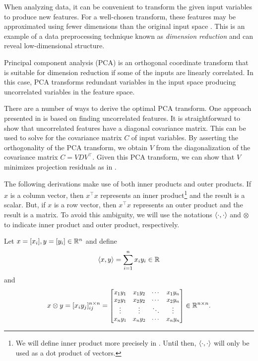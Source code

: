When analyzing data, it can be convenient to transform the given input variables to produce new features.
For a well-chosen transform, these features may be approximated using fewer dimensions than the original input space \cite{koutroumbas2008pattern}.
This is an example of a data preprocessing technique known as \textit{dimension reduction} and can reveal low-dimensional structure.

Principal component analysis (PCA) is an orthogonal coordinate transform that is suitable for dimension reduction if some of the inputs are linearly correlated.
In this case, PCA transforms redundant variables in the input space producing uncorrelated variables in the feature space.

There are a number of ways to derive the optimal PCA transform.
One approach presented in \cite{koutroumbas2008pattern} is based on finding uncorrelated features.
It is straightforward to show that uncorrelated features have a diagonal covariance matrix.
This can be used to solve for the covariance matrix \(C\) of input variables.
By asserting the orthogonality of the PCA transform, we obtain \(V\) from the diagonalization of the covariance matrix \(C = VDV^\top\).
Given this PCA transform, we can show that \(V\) minimizes projection residuals as in \cite{shalizi2021advanced}.

\begin{remark}
    \label{rmk:inner-outer-product-notation}
    The following derivations make use of both inner products and outer products.
    If \(x\) is a column vector, then \(x^\top x\) represents an inner product\footnote{
        We will define inner product more precisely in .
        Until then, \(\left\langle \cdot, \cdot \right\rangle\) will only be used as a dot product of vectors.
    } and the result is a scalar.
    But, if \(x\) is a row vector, then \(x^\top x\) represents an outer product and the result is a matrix.
    To avoid this ambiguity, we will use the notations \(\left\langle \cdot, \cdot \right\rangle\) and \(\otimes\) to indicate inner product and outer product, respectively.

    Let \(x = [x_i], y = [y_i] \in \mathbb{R}^n\) and define
    \begin{equation}
        \label{eqn:inner-product-notation}
        \left\langle x,y \right\rangle = \sum_{i=1}^{n} x_i y_i \in \mathbb{R}
    \end{equation}
    and
    \begin{equation}
        \def\medmat#1{\scalebox{.9}{\(\begin{bmatrix} #1 \end{bmatrix}\)}}
        \label{eqn:outer-product-notation}
        x \otimes y
        = [x_i y_j]_{ij}^{n \times n}
        = \medmat{
            x_1 y_1 & x_1 y_2 & \cdots & x_1 y_n\\
            x_2 y_1 & x_2 y_2 & \cdots & x_2 y_n\\
            \vdots & \vdots & \ddots & \vdots \\
            x_n y_1 & x_n y_2 & \cdots & x_n y_n
        } \in \RR^{n \times n}.
    \end{equation}
\end{remark}
